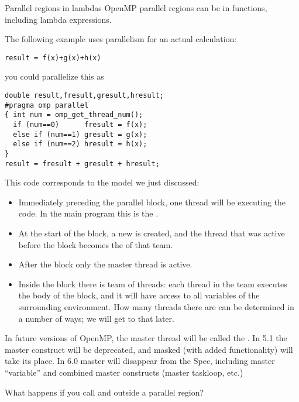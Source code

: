 \begin{cppnote}{Parallel regions in lambdas}
  OpenMP parallel regions can be in functions,
  including lambda expressions.
\end{cppnote}

The following example uses parallelism for an actual calculation:
\begin{lstlisting}
result = f(x)+g(x)+h(x)
\end{lstlisting}
you could parallelize this as
\begin{lstlisting}
double result,fresult,gresult,hresult;
#pragma omp parallel
{ int num = omp_get_thread_num();
  if (num==0)      fresult = f(x);
  else if (num==1) gresult = g(x);
  else if (num==2) hresult = h(x);
}
result = fresult + gresult + hresult;
\end{lstlisting}

This code corresponds to the model we just discussed:
\begin{itemize}
\item Immediately preceding the parallel block, one thread will be
  executing the code.
  In the main program this is the .
\item At the start of the block, a new  is
  created, and the thread that was active before the block
  becomes the  of that team.
\item After the block only the master thread is active.
\item Inside the block there is team of threads: each thread in the
  team executes the body of the block, and it will have access to all
  variables of the surrounding environment.
  How many
  threads there are can be determined in a number of ways; we will get to that later.
\end{itemize}

\begin{remark}
  In future versions of OpenMP, the master thread will be called
  the .
  In 5.1 the master construct will be deprecated, and masked (with
  added functionality) will take its place.  In 6.0 master will
  disappear from the Spec, including  master “variable”
  and combined master constructs (master taskloop, etc.)
\end{remark}

\begin{exercise}
  What happens if you call  and 
  outside a parallel region?
\end{exercise}


